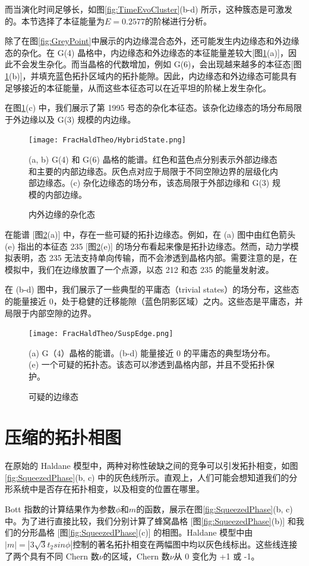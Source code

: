 而当演化时间足够长，如图\ref{fig:TimeEvoCluster}(b-d) 所示，这种簇态是可激发的。本节选择了本征能量为$E=0.2577$的阶梯进行分析。

除了在图\ref{fig:GreyPoint}中展示的内边缘混合态外，还可能发生内边缘态和外边缘态的杂化。在 G(4) 晶格中，内边缘态和外边缘态的本征能量差较大[图\ref{fig:HybridState}(a)]，因此不会发生杂化。而当晶格的代数增加，例如 G(6)，会出现越来越多的本征态[图\ref{fig:HybridState}(b)]，并填充蓝色拓扑区域内的拓扑能隙。因此，内边缘态和外边缘态可能具有足够接近的本征能量，从而这些本征态可以在近平坦的阶梯上发生杂化。

在图\ref{fig:HybridState}(c) 中，我们展示了第 1995 号态的杂化本征态。该杂化边缘态的场分布局限于外边缘以及 G(3) 规模的内边缘。
\begin{figure}[htbp]
    \centering
    \texttt{[image: FracHaldTheo/HybridState.png]}
    \caption{内外边缘的杂化态}(a, b) G(4) 和 G(6) 晶格的能谱。红色和蓝色点分别表示外部边缘态和主要的内部边缘态。灰色点对应于局限于不同空隙边界的层级化内部边缘态。(c) 杂化边缘态的场分布，该态局限于外部边缘和 G(3) 规模的内部边缘。
    \label{fig:HybridState}
\end{figure}

在能谱 [图\ref{fig:SuspEdge}(a)] 中，存在一些可疑的拓扑边缘态。例如，在 (a) 图中由红色箭头 (e) 指出的本征态 235 [图\ref{fig:SuspEdge}(e)] 的场分布看起来像是拓扑边缘态。然而，动力学模拟表明，态 235 无法支持单向传输，而不会渗透到晶格内部。需要注意的是，在模拟中，我们在边缘放置了一个点源，以态 212 和态 235 的能量发射波。

在 (b-d) 图中，我们展示了一些典型的平庸态（trivial states）的场分布，这些态的能量接近 0，处于稳健的迁移能隙（蓝色阴影区域）之内。这些态是平庸态，并局限于内部空隙的边界。
\begin{figure}[htbp]
    \centering
    \texttt{[image: FracHaldTheo/SuspEdge.png]}
    \caption{可疑的边缘态}
    \label{fig:SuspEdge}(a) G（4）晶格的能谱。(b-d) 能量接近 0 的平庸态的典型场分布。(e) 一个可疑的拓扑态。该态可以渗透到晶格内部，并且不受拓扑保护。
\end{figure}
\section{压缩的拓扑相图}
在原始的 Haldane 模型中，两种对称性破缺之间的竞争可以引发拓扑相变，如图 \ref{fig:SqueezedPhase}(b, c) 中的灰色线所示。直观上，人们可能会想知道我们的分形系统中是否存在拓扑相变，以及相变的位置在哪里。

Bott 指数的计算结果作为参数$\phi$和$m$的函数，展示在图\ref{fig:SqueezedPhase}(b, c) 中。为了进行直接比较，我们分别计算了蜂窝晶格 [图\ref{fig:SqueezedPhase}(b)] 和我们的分形晶格 [图\ref{fig:SqueezedPhase}(c)] 的相图。Haldane 模型中由$|m|=|3\sqrt{3}t_2sin\phi|$控制的著名拓扑相变在两幅图中均以灰色线标出。这些线连接了两个具有不同 Chern 数$\nu$的区域，Chern 数$\nu$从 0 变化为 +1 或 -1。

